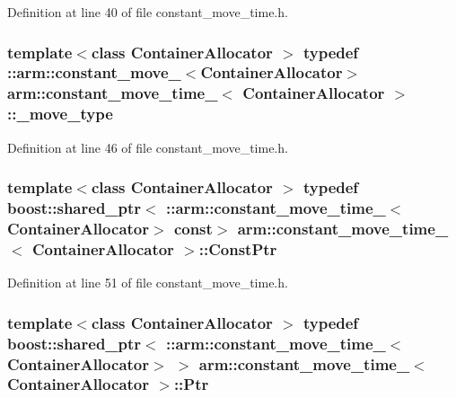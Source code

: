 \-Definition at line 40 of file constant\-\_\-move\-\_\-time.\-h.

\subsubsection[{\-\_\-move\-\_\-type}]{\setlength{\rightskip}{0pt plus 5cm}template$<$class Container\-Allocator $>$ typedef \-::{\bf arm\-::constant\-\_\-move\-\_\-}$<$\-Container\-Allocator$>$ {\bf arm\-::constant\-\_\-move\-\_\-time\-\_\-}$<$ \-Container\-Allocator $>$\-::{\bf \-\_\-move\-\_\-type}}\label{structarm_1_1constant__move__time___a773b095529d30abeb4b9029d235e4763}


\-Definition at line 46 of file constant\-\_\-move\-\_\-time.\-h.

\subsubsection[{\-Const\-Ptr}]{\setlength{\rightskip}{0pt plus 5cm}template$<$class Container\-Allocator $>$ typedef boost\-::shared\-\_\-ptr$<$ \-::{\bf arm\-::constant\-\_\-move\-\_\-time\-\_\-}$<$\-Container\-Allocator$>$ const$>$ {\bf arm\-::constant\-\_\-move\-\_\-time\-\_\-}$<$ \-Container\-Allocator $>$\-::{\bf \-Const\-Ptr}}\label{structarm_1_1constant__move__time___a190e8a8e76a293224c1982b864823965}


\-Definition at line 51 of file constant\-\_\-move\-\_\-time.\-h.

\subsubsection[{\-Ptr}]{\setlength{\rightskip}{0pt plus 5cm}template$<$class Container\-Allocator $>$ typedef boost\-::shared\-\_\-ptr$<$ \-::{\bf arm\-::constant\-\_\-move\-\_\-time\-\_\-}$<$\-Container\-Allocator$>$ $>$ {\bf arm\-::constant\-\_\-move\-\_\-time\-\_\-}$<$ \-Container\-Allocator $>$\-::{\bf \-Ptr}}\label{structarm_1_1constant__move__time___a87215f9c396da6054d9ebf53feebc2f6}


